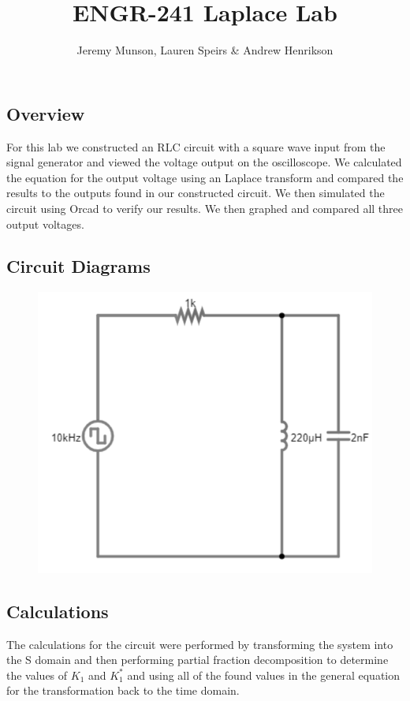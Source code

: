 \documentclass[11pt]{article}
\title{ENGR-241 Laplace Lab}
\author{Jeremy Munson, Lauren Speirs \& Andrew Henrikson}
\begin{document}
	\maketitle
	\subsection*{Overview}
	For this lab we constructed an RLC circuit with a square wave input from the signal generator and viewed the voltage output on the oscilloscope. We calculated the equation  for the output voltage using an Laplace transform and compared the results to the outputs found in our constructed circuit. We then simulated the circuit using Orcad to verify our results. We then graphed and compared all three output voltages.
	\subsection*{Circuit Diagrams}
	
	\begin{figure}[H]
	\centering
	\includegraphics[width=5in]{images/basic diagram.png}
	\end{figure}
		
	\subsection*{Calculations}
	The calculations for the circuit were performed by transforming the system into the S domain and then performing partial fraction decomposition to determine the values of $K_{1}$ and $K^{*}_{1}$ and using all of the found values in the general equation for the transformation back to the time domain.
\end{document}
